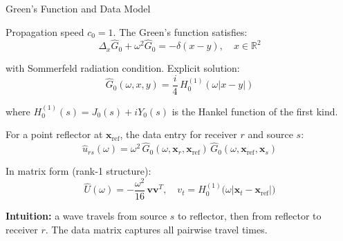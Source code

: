 \documentclass{beamer}
\begin{document}
\begin{frame}{Green's Function and Data Model}
  \footnotesize
  \vspace{-0.2cm}
  \begin{tcolorbox}[keybox, title=2D Homogeneous Green's Function]
    Propagation speed $c_0=1$. The Green's function satisfies:
    \vspace{-0.25cm}
    $$\Delta_x \hat{G}_0 + \omega^2 \hat{G}_0 = -\delta(x-y), \quad x \in \mathbb{R}^2$$
    \vspace{-0.45cm}

    with Sommerfeld radiation condition. Explicit solution:
    \vspace{-0.25cm}
    $$\hat{G}_0(\omega, x, y) = \frac{i}{4}\, H_0^{(1)}(\omega |x-y|)$$
    \vspace{-0.45cm}

    {\footnotesize where $H_0^{(1)}(s) = J_0(s) + iY_0(s)$ is the Hankel function of the first kind.}
  \end{tcolorbox}

  \vspace{-0.15cm} 
  \begin{tcolorbox}[stressbox, title=Data Model (Born Approximation)]
    \footnotesize
    For a point reflector at $\bm{x}_{\mathrm{ref}}$, the data entry for receiver $r$ and source $s$:
    \vspace{-0.2cm}
    $$\hat{u}_{rs}(\omega) = \omega^2\, \hat{G}_0(\omega, \bm{x}_r, \bm{x}_{\mathrm{ref}})\, \hat{G}_0(\omega, \bm{x}_{\mathrm{ref}}, \bm{x}_s)$$
    \vspace{-0.4cm}

    In matrix form (rank-1 structure):
    \vspace{-0.2cm}
    $$\hat{U}(\omega) = -\frac{\omega^2}{16}\, \mathbf{v}\mathbf{v}^T, \quad v_t = H_0^{(1)}\!\bigl(\omega|\bm{x}_t - \bm{x}_{\mathrm{ref}}|\bigr)$$

    \textbf{Intuition:} a wave travels from source $s$ to reflector, then from reflector to receiver $r$. The data matrix captures all pairwise travel times.
  \end{tcolorbox}
\end{frame}
\end{document}
